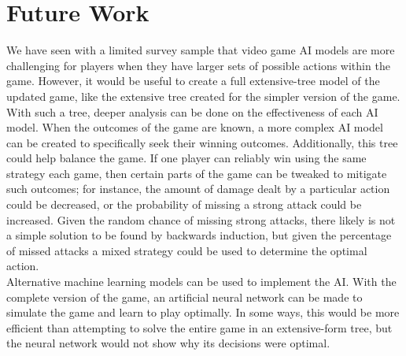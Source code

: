 \chapter{Future Work}
We have seen with a limited survey sample that video game AI models are more challenging for players when they have larger sets of possible actions within the game. However, it would be useful to create a full extensive-tree model of the updated game, like the extensive tree created for the simpler version of the game. With such a tree, deeper analysis can be done on the effectiveness of each AI model. When the outcomes of the game are known, a more complex AI model can be created to specifically seek their winning outcomes. Additionally, this tree could help balance the game. If one player can reliably win using the same strategy each game, then certain parts of the game can be tweaked to mitigate such outcomes; for instance, the amount of damage dealt by a particular action could be decreased, or the probability of missing a strong attack could be increased. Given the random chance of missing strong attacks, there likely is not a simple solution to be found by backwards induction, but given the percentage of missed attacks a mixed strategy could be used to determine the optimal action.\\

Alternative machine learning models can be used to implement the AI. With the complete version of the game, an artificial neural network can be made to simulate the game and learn to play optimally. In some ways, this would be more efficient than attempting to solve the entire game in an extensive-form tree, but the neural network would not show why its decisions were optimal.